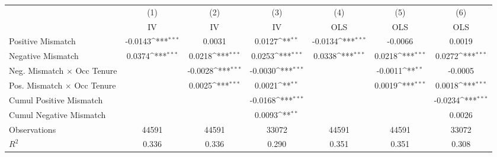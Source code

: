 {
\def\sym#1{\ifmmode^{#1}\else\(^{#1}\)\fi}
\begin{tabular}{l*{6}{c}}
\hline  
                    &\multicolumn{1}{c}{(1)}&\multicolumn{1}{c}{(2)}&\multicolumn{1}{c}{(3)}&\multicolumn{1}{c}{(4)}&\multicolumn{1}{c}{(5)}&\multicolumn{1}{c}{(6)}\\
                    &\multicolumn{1}{c}{IV}&\multicolumn{1}{c}{IV}&\multicolumn{1}{c}{IV}&\multicolumn{1}{c}{OLS}&\multicolumn{1}{c}{OLS}&\multicolumn{1}{c}{OLS}\\
\hline  
Positive Mismatch   &     -0.0143\sym{***}&      0.0031         &      0.0127\sym{**} &     -0.0134\sym{***}&     -0.0066         &      0.0019         \\
[1em]
Negative Mismatch   &      0.0374\sym{***}&      0.0218\sym{***}&      0.0253\sym{***}&      0.0338\sym{***}&      0.0218\sym{***}&      0.0272\sym{***}\\
[1em]
Neg. Mismatch $\times$ Occ Tenure&                     &     -0.0028\sym{***}&     -0.0030\sym{***}&                     &     -0.0011\sym{**} &     -0.0005         \\
[1em]
Pos. Mismatch $\times$ Occ Tenure&                     &      0.0025\sym{***}&      0.0021\sym{**} &                     &      0.0019\sym{***}&      0.0018\sym{***}\\
[1em]
Cumul Positive Mismatch&                     &                     &     -0.0168\sym{***}&                     &                     &     -0.0234\sym{***}\\
[1em]
Cumul Negative Mismatch&                     &                     &      0.0093\sym{**} &                     &                     &      0.0026         \\
\hline  
Observations        &       44591         &       44591         &       33072         &       44591         &       44591         &       33072         \\
\(R^{2}\)           &       0.336         &       0.336         &       0.290         &       0.351         &       0.351         &       0.308         \\
\hline  
\end{tabular}
}
